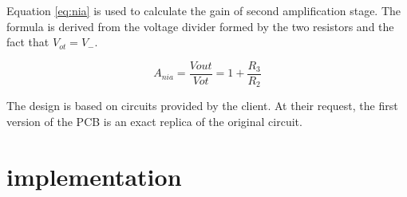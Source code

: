 Equation \ref{eq:nia} is used to calculate the gain of second amplification stage. The formula is derived from the voltage divider formed by the two resistors and the fact that $V_{ot} = V_{-}$.

\begin{equation}\label{eq:nia}
	A_{nia} = \frac{V{out}}{V{ot}} = 1 + \frac{R_3}{R_2}
\end{equation}

The design is based on circuits provided by the client. At their request, the first version of the PCB is an exact replica of the original circuit.  

\section{ implementation}
